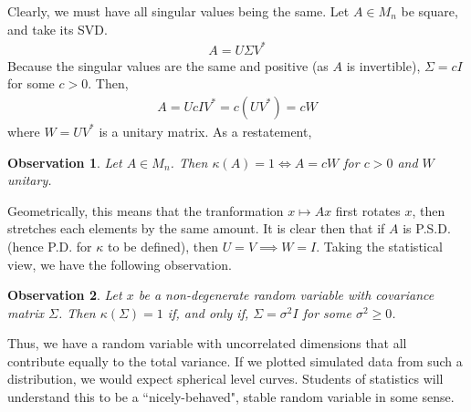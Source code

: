 \documentclass[11pt]{article}
\theoremstyle{plain}
\newtheorem{obs}{Observation}[section]
\theoremstyle{definition}
\theoremstyle{remark}
\begin{document}
Clearly, we must have all singular values being the same. Let $A \in M_n$ be square, and take its SVD.
\begin{align*}
    A = U\Sigma V^*
\end{align*}
Because the singular values are the same and positive (as $A$ is invertible), $\Sigma = c I$ for some $c > 0$. Then,
\begin{align*}
    A = U c I V^* = c (U V^*) = c W
\end{align*}
where $W = UV^*$ is a unitary matrix. As a restatement,
\begin{obs}
    Let $A \in M_n$. Then $\kappa(A) = 1 \iff A = cW$ for $c > 0$ and $W$ unitary.
\end{obs}
Geometrically, this means that the tranformation $x \mapsto Ax$ first rotates $x$, then stretches each elements by the same amount. It is clear then that if $A$ is P.S.D. (hence P.D. for $\kappa$ to be defined), then $U = V \implies W = I$. Taking the statistical view, we have the following observation.
\begin{obs}
    Let $x$ be a non-degenerate random variable with covariance matrix $\Sigma$. Then $\kappa(\Sigma) = 1$ if, and only if, $\Sigma = \sigma^2 I$ for some $\sigma^2 \geq 0$.
\end{obs}
Thus, we have a random variable with uncorrelated dimensions that all contribute equally to the total variance. If we plotted simulated data from such a distribution, we would expect spherical level curves. Students of statistics will understand this to be a ``nicely-behaved", stable random variable in some sense.
\end{document}
